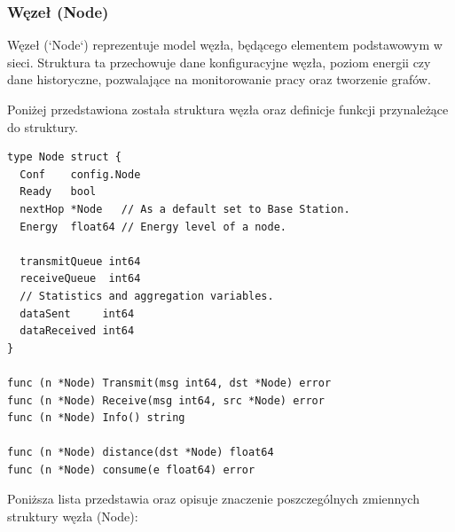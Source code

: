 \documentclass[a4paper,12pt,twoside,openany]{report}
\begin{document}
\subsubsection{Węzeł (Node)}

Węzeł (`Node`) reprezentuje model węzła, będącego elementem podstawowym w sieci. Struktura ta przechowuje dane konfiguracyjne węzła,
poziom energii czy dane historyczne, pozwalające na monitorowanie pracy oraz tworzenie grafów.

Poniżej przedstawiona została struktura węzła oraz definicje funkcji przynależące do struktury.

\begin{lstlisting}
type Node struct {
  Conf    config.Node
  Ready   bool
  nextHop *Node   // As a default set to Base Station.
  Energy  float64 // Energy level of a node.

  transmitQueue int64
  receiveQueue  int64
  // Statistics and aggregation variables.
  dataSent     int64
  dataReceived int64
}

func (n *Node) Transmit(msg int64, dst *Node) error
func (n *Node) Receive(msg int64, src *Node) error
func (n *Node) Info() string

func (n *Node) distance(dst *Node) float64
func (n *Node) consume(e float64) error
\end{lstlisting}

Poniższa lista przedstawia oraz opisuje znaczenie poszczególnych zmiennych struktury węzła (Node):
\end{document}
